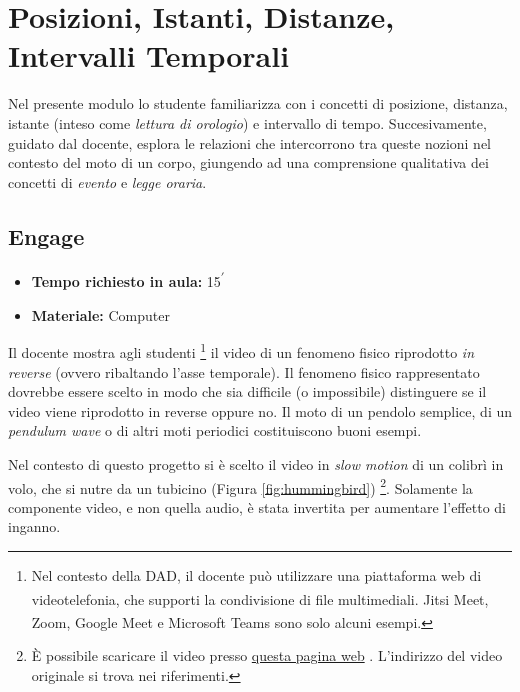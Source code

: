 \documentclass{report} \usepackage[T1]{fontenc} \usepackage[italian]{babel}
\begin{document}
\chapter{Posizioni, Istanti, Distanze, Intervalli Temporali} \label{posizioni_istanti}
Nel presente modulo lo studente familiarizza con i concetti
di posizione, distanza, istante (inteso come
\emph{lettura di orologio}) e intervallo di tempo.
Succesivamente, guidato dal docente, esplora le relazioni
che intercorrono tra queste nozioni nel contesto del moto di
un corpo, giungendo ad una comprensione qualitativa dei
concetti di \emph{evento} e \emph{legge oraria}.

\section{Engage}
\begin{itemize}
\item \textbf{Tempo richiesto in aula:} 15\textsuperscript{$\prime$}
\item \textbf{Materiale:} Computer
\end{itemize}

Il docente mostra agli studenti
\footnote{
Nel contesto della DAD, il docente può utilizzare
una piattaforma web di videotelefonia, che supporti la condivisione
di file multimediali. Jitsi Meet\textsuperscript{\textregistered},
Zoom\textsuperscript{\textregistered},
Google Meet\textsuperscript{\textregistered} e
Microsoft Teams\textsuperscript{\textregistered}
sono solo alcuni esempi.
}
il video di un fenomeno fisico riprodotto \emph{in reverse} (ovvero ribaltando
l'asse temporale). Il fenomeno fisico rappresentato dovrebbe essere scelto
in modo che sia difficile (o impossibile) distinguere se il video viene
riprodotto in reverse oppure no. Il moto di un pendolo semplice,
di un \emph{pendulum wave} o di altri moti periodici costituiscono buoni
esempi.

Nel contesto di questo progetto si è scelto il video in \emph{slow motion}
di un colibrì in volo, che si nutre da un tubicino (Figura \ref{fig:hummingbird})
\footnote{
\`E possibile scaricare il video presso
\href{https://github.com/savaroskij/PED1/blob/master/progetto_finale/media/video/Hummingbird.mp4?raw=true}{questa pagina web}
. L'indirizzo del video originale si trova nei riferimenti\cite{hbird}.
}.
Solamente la componente video, e non quella audio, è stata invertita per
aumentare l'effetto di inganno.
\end{document}
